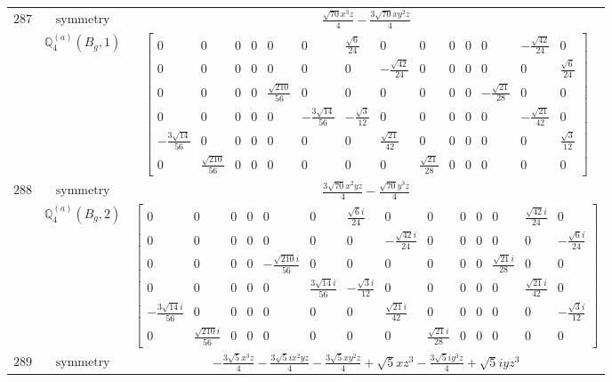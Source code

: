 \documentclass[fleqn,8pt,landscape]{jsarticle}
\begin{document}
\begin{longtable}{ccc}
$ 287 $ & $ \text{symmetry} $ & $ \frac{\sqrt{70} x^{3} z}{4} - \frac{3 \sqrt{70} x y^{2} z}{4} $ \\
$  $ & $ \mathbb{Q}_{4}^{(a)}(B_{g},1) $ & $ \begin{bmatrix} 0 & 0 & 0 & 0 & 0 & 0 & \frac{\sqrt{6}}{24} & 0 & 0 & 0 & 0 & 0 & - \frac{\sqrt{42}}{24} & 0 \\ 0 & 0 & 0 & 0 & 0 & 0 & 0 & - \frac{\sqrt{42}}{24} & 0 & 0 & 0 & 0 & 0 & \frac{\sqrt{6}}{24} \\ 0 & 0 & 0 & 0 & \frac{\sqrt{210}}{56} & 0 & 0 & 0 & 0 & 0 & 0 & - \frac{\sqrt{21}}{28} & 0 & 0 \\ 0 & 0 & 0 & 0 & 0 & - \frac{3 \sqrt{14}}{56} & - \frac{\sqrt{3}}{12} & 0 & 0 & 0 & 0 & 0 & - \frac{\sqrt{21}}{42} & 0 \\ - \frac{3 \sqrt{14}}{56} & 0 & 0 & 0 & 0 & 0 & 0 & \frac{\sqrt{21}}{42} & 0 & 0 & 0 & 0 & 0 & \frac{\sqrt{3}}{12} \\ 0 & \frac{\sqrt{210}}{56} & 0 & 0 & 0 & 0 & 0 & 0 & \frac{\sqrt{21}}{28} & 0 & 0 & 0 & 0 & 0 \end{bmatrix} $ \\ \hline
$ 288 $ & $ \text{symmetry} $ & $ \frac{3 \sqrt{70} x^{2} y z}{4} - \frac{\sqrt{70} y^{3} z}{4} $ \\
$  $ & $ \mathbb{Q}_{4}^{(a)}(B_{g},2) $ & $ \begin{bmatrix} 0 & 0 & 0 & 0 & 0 & 0 & \frac{\sqrt{6} i}{24} & 0 & 0 & 0 & 0 & 0 & \frac{\sqrt{42} i}{24} & 0 \\ 0 & 0 & 0 & 0 & 0 & 0 & 0 & - \frac{\sqrt{42} i}{24} & 0 & 0 & 0 & 0 & 0 & - \frac{\sqrt{6} i}{24} \\ 0 & 0 & 0 & 0 & - \frac{\sqrt{210} i}{56} & 0 & 0 & 0 & 0 & 0 & 0 & \frac{\sqrt{21} i}{28} & 0 & 0 \\ 0 & 0 & 0 & 0 & 0 & \frac{3 \sqrt{14} i}{56} & - \frac{\sqrt{3} i}{12} & 0 & 0 & 0 & 0 & 0 & \frac{\sqrt{21} i}{42} & 0 \\ - \frac{3 \sqrt{14} i}{56} & 0 & 0 & 0 & 0 & 0 & 0 & \frac{\sqrt{21} i}{42} & 0 & 0 & 0 & 0 & 0 & - \frac{\sqrt{3} i}{12} \\ 0 & \frac{\sqrt{210} i}{56} & 0 & 0 & 0 & 0 & 0 & 0 & \frac{\sqrt{21} i}{28} & 0 & 0 & 0 & 0 & 0 \end{bmatrix} $ \\ \hline
$ 289 $ & $ \text{symmetry} $ & $ - \frac{3 \sqrt{5} x^{3} z}{4} - \frac{3 \sqrt{5} i x^{2} y z}{4} - \frac{3 \sqrt{5} x y^{2} z}{4} + \sqrt{5} x z^{3} - \frac{3 \sqrt{5} i y^{3} z}{4} + \sqrt{5} i y z^{3} $ \\

\end{longtable}
\end{document}
